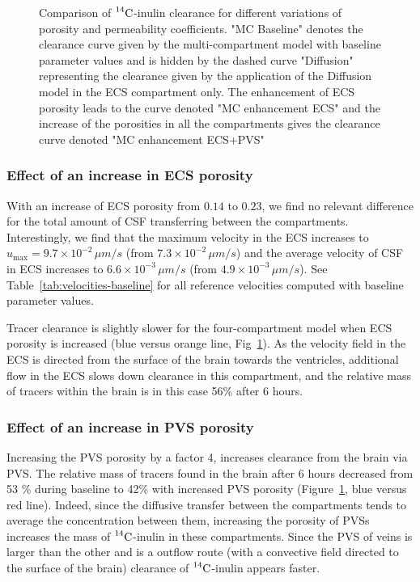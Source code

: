 \documentclass[10pt]{article}
\newcommand{\1}{^{(1)}}
\newcommand{\2}{^{(2)}}
\newcommand{\Cinulin}{$\prescript{14}{}{\text{C}}$-inulin }
\begin{document}
\begin{figure}[htbp]
         \centering
        \caption{Comparison of \Cinulin clearance for different variations of porosity and permeability coefficients. "MC Baseline" denotes the  clearance curve given by the multi-compartment model with baseline parameter values and is hidden by the dashed curve "Diffusion" representing the clearance given by the application of the Diffusion model in the ECS compartment only. The enhancement of ECS porosity leads to the curve denoted "MC enhancement ECS" and  the increase of the porosities in all the compartments gives the clearance curve denoted "MC enhancement ECS+PVS"}
        \label{fig:compare-poro}
\end{figure}



\subsubsection{Effect of an increase in ECS porosity}

With an increase of ECS porosity from $0.14$ to $0.23$, we find no relevant difference for the total amount of CSF transferring between the compartments. Interestingly, we find that the maximum velocity in the ECS increases to $u_\text{max} = 9.7\times 10^{-2}\, \si{\mu m/s}$ (from $7.3 \times 10^{-2}\, \si{\mu m/s}$) and the average velocity of CSF in ECS increases to $6.6\times 10^{-3}\, \si{\mu m/s}$ (from $4.9\times 10^{-3}\, \si{\mu m/s}$). See Table~\ref{tab:velocities-baseline} for all reference velocities computed with baseline parameter values.

Tracer clearance is slightly slower for the four-compartment model when ECS porosity is increased (blue versus orange line, Fig~\ref{fig:compare-poro}). As the velocity field in the ECS is directed from the surface of the brain towards the ventricles, additional flow in the ECS slows down clearance in this compartment, and the relative mass of tracers within the brain is in this case 56\% after 6 hours. 

\subsubsection{Effect of an increase in PVS porosity}

Increasing the PVS porosity by a factor 4, increases clearance from the brain via PVS. The relative mass of tracers found in the brain after 6 hours decreased from 53 \% during baseline to 42\% with increased PVS porosity (Figure~\ref{fig:compare-poro}, blue versus red line). Indeed, since the diffusive transfer between the compartments tends to average the concentration between them, increasing the porosity of PVSs increases the mass of \Cinulin in these compartments. Since the PVS of veins is larger than the other and is a outflow route (with a convective field directed to the surface of the brain) clearance of \Cinulin appears faster.
\end{document}
